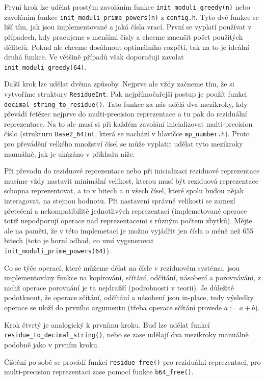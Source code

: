 \documentclass[titlepage]{article}
\begin{document}
První krok lze udělat prostým zavoláním funkce \verb|init_moduli_greedy(n)|
nebo zavoláním funkce \verb|init_moduli_prime_powers(n)| z
\verb|config.h|. Tyto dvě funkce se liší tím, jak jsou implementované a jaká
čísla vrací. První se vyplatí používat v případech, kdy pracujeme s menšími
čísly a chceme zmenšit počet použitých dělitelů. Pokud ale chceme dosáhnout
optimálního rozpětí, tak na to je ideální druhá funkce. Ve většině případů však 
doporučuji zavolat \verb|init_moduli_greedy(64)|.

Další krok lze udělat dvěma způsoby. Nejprve ale vždy začneme tím, že si
vytvoříme struktury \verb|ResidueInt|. Pak nejpřímočařejší postup je použít
funkci \verb|decimal_string_to_residue()|. Tato funkce za nás udělá dva
mezikroky, kdy převádí řetězec nejprve do multi-precision reprezentace a tu pak
do reziduální reprezentace. Na to ale musí si při každém zavolání inicializovat
multi-precision číslo (strukturu \verb|Base2_64Int|, která se nachází v
hlavičce \verb|mp_number.h|). Proto pro převádění velkého množství čísel se
může vyplatit udělat tyto mezikroky manuálně, jak je ukázáno v příkladu níže.

Při převodu do reziduové reprezentace nebo při inicializaci reziduové
reprezentace musíme vždy nastavit minimální velikost, kterou musí být reziduová
reprezentace schopna reprezentovat, a to v bitech a u všech čísel, které spolu
budou nějak interagovat, na stejnou hodnotu. Při nastavení správné velikosti se
zamezí přetečení a nekompatibilitě jednotlivých reprezentací (implemetované
operace totiž nepodporují operace nad reprezentacemi s různým počtem zbytků).
Mějte ale na paměti, že v této implemetaci je možno vyjádřit jen čísla o méně
než 655 bitech (toto je horní odhad, co umí vygenerovat
\verb|init_moduli_prime_powers(64)|).

Co se týče operací, které můžeme dělat na čísle v reziduovém systému, jsou
implementovány funkce na kopírování, sčítání, odčítání, násobení a porovnávání,
z nichž operace porovnání je ta nejdražší (podrobnosti v teorii). Je důležité
podotknout, že operace sčítání, odčítání a násobení jsou in-place, tedy
výsledky operace se uloží do prvního argumentu (třeba operace sčítání provede
$a := a+b$). 

Krok čtvrtý je analogický k prvnímu kroku. Buď lze udělat funkcí
\verb|residue_to_decimal_string()|, nebo se zase udělají dva mezikroky manuálně
podobně jako v prvním kroku.

Čištění po sobě se provádí funkcí \verb|residue_free()| pro reziduální
reprezentaci, pro multi-precision reprezentaci zase pomocí funkce
\verb|b64_free()|.
\end{document}
